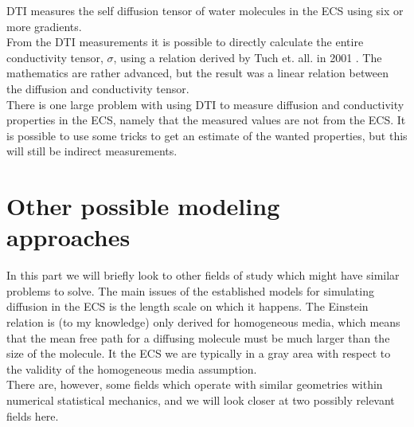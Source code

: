 \documentclass[a4paper,english, 12pt, twoside]{article}
\begin{document}
DTI measures the self diffusion tensor of water molecules in the ECS using six or more gradients. \\
From the DTI measurements it is possible to directly calculate the entire conductivity tensor, $\sigma$, using a relation derived by Tuch et. all. in 2001 \cite{tuch2001conductivity}. 
The mathematics are rather advanced, but the result was a linear relation between the diffusion and conductivity tensor. \\
There is one large problem with using DTI to measure diffusion and conductivity properties in the ECS, namely that the measured values are not from the ECS. 
It is possible to use some tricks to get an estimate of the wanted properties, but this will still be indirect measurements.

\section{Other possible modeling approaches}
In this part we will briefly look to other fields of study which might have similar problems to solve. 
The main issues of the established models for simulating diffusion in the ECS is the length scale on which it happens. 
The Einstein relation is (to my knowledge) only derived for homogeneous media, which means that the mean free path for a diffusing molecule must be much larger than the size of the molecule. 
It the ECS we are typically in a gray area with respect to the validity of the homogeneous media assumption. \\
There are, however, some fields which operate with similar geometries within numerical statistical mechanics, and we will look closer at two possibly relevant fields here.
\end{document}
